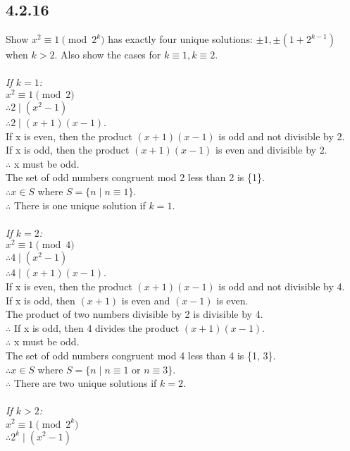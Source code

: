 \documentclass{article}
\begin{document}
\subsection{4.2.16}
Show $x^2 \equiv 1 \pmod{2^k}$ has exactly four unique solutions: $\pm1, \pm(1+2^{k-1})$ when $k>2$. Also show the cases for $k \equiv 1, k\equiv 2$.
\\
\\\emph{If $k=1$:}
\\$x^2 \equiv 1 \pmod{2}$
\\$\therefore 2 \mid (x^2 - 1)$
\\$\therefore 2 \mid (x + 1)(x - 1)$.
\\If x is even, then the product $(x + 1)(x - 1)$ is odd and not divisible by 2.
\\If x is odd, then the product $(x + 1)(x - 1)$ is even and divisible by 2.
\\$\therefore$ x must be odd.
\\The set of odd numbers congruent mod 2 less than 2 is \{1\}.
\\$\therefore x \in S$ where $S = \{n \mid n \equiv 1\}$.
\\$\therefore$ There is one unique solution if $k=1$.
\\
\\\emph{If $k=2$:}
\\$x^2 \equiv 1 \pmod{4}$
\\$\therefore 4 \mid (x^2 - 1)$
\\$\therefore 4 \mid (x + 1)(x - 1)$.
\\If x is even, then the product $(x + 1)(x - 1)$ is odd and not divisible by 4.
\\If x is odd, then $(x + 1)$ is even and $(x - 1)$ is even.
\\The product of two numbers divisible by 2 is divisible by 4.
\\$\therefore$ If x is odd, then 4 divides the product $(x + 1)(x - 1)$.
\\$\therefore$ x must be odd.
\\The set of odd numbers congruent mod 4 less than 4 is \{1, 3\}.
\\$\therefore x \in S$ where $S = \{n \mid n \equiv 1$ or $n \equiv 3\}$.
\\$\therefore$ There are two unique solutions if $k=2$.
\\
\\\emph{If $k>2$:}
\\$x^2 \equiv 1 \pmod{2^k}$
\\$\therefore 2^k \mid (x^2 - 1)$
\end{document}
